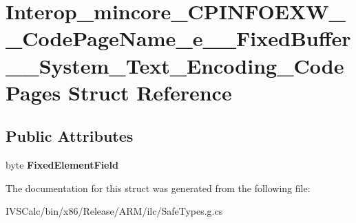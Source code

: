 \hypertarget{struct_interop__mincore___c_p_i_n_f_o_e_x_w_____code_page_name__e_____fixed_buffer_____system___text___encoding___code_pages}{}\section{Interop\+\_\+mincore\+\_\+\+C\+P\+I\+N\+F\+O\+E\+X\+W\+\_\+\+\_\+\+Code\+Page\+Name\+\_\+e\+\_\+\+\_\+\+Fixed\+Buffer\+\_\+\+\_\+\+System\+\_\+\+Text\+\_\+\+Encoding\+\_\+\+Code\+Pages Struct Reference}
\label{struct_interop__mincore___c_p_i_n_f_o_e_x_w_____code_page_name__e_____fixed_buffer_____system___text___encoding___code_pages}
\subsection*{Public Attributes}
\begin{DoxyCompactItemize}
\item 
\mbox{\label{struct_interop__mincore___c_p_i_n_f_o_e_x_w_____code_page_name__e_____fixed_buffer_____system___text___encoding___code_pages_aa5b811f652a70d4aff702707e50704b4}} 
byte {\bfseries Fixed\+Element\+Field}
\end{DoxyCompactItemize}


The documentation for this struct was generated from the following file\+:\begin{DoxyCompactItemize}
\item 
I\+V\+S\+Calc/bin/x86/\+Release/\+A\+R\+M/ilc/Safe\+Types.\+g.\+cs\end{DoxyCompactItemize}
